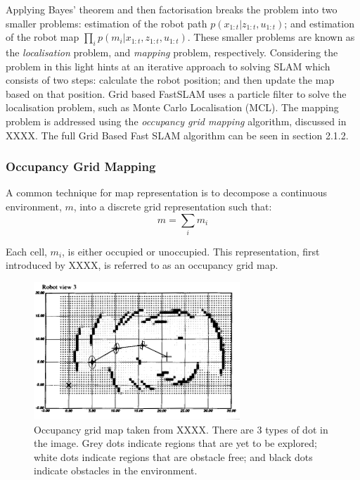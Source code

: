 \documentclass[a4paper]{article}
\begin{document}
Applying Bayes' theorem and then factorisation breaks the problem into two smaller problems: estimation of the robot path $p(x_{1:t} | z_{1:t}, u_{1:t})$; and estimation of the robot map $\prod_{i}p(m_i | x_{1:t}, z_{1:t}, u_{1:t})$. These smaller problems are known as the \textit{localisation} problem, and \textit{mapping} problem, respectively. Considering the problem in this light hints at an iterative approach to solving SLAM which consists of two steps: calculate the robot position; and then update the map based on that position. Grid based FastSLAM uses a particle filter to solve the localisation problem, such as Monte Carlo Localisation (MCL). The mapping problem is addressed using the \textit{occupancy grid mapping} algorithm, discussed in XXXX. The full Grid Based Fast SLAM algorithm can be seen in section 2.1.2.


\subsubsection{Occupancy Grid Mapping}
A common technique for map representation is to decompose a continuous environment, $m$, into a discrete grid representation such that:
\begin{equation}
m = \sum_{i} m_i
\end{equation}

Each cell, $m_i$, is either occupied or unoccupied. This representation, first introduced by XXXX, is referred to as an occupancy grid map.
\begin{figure}[h]
\centering
\includegraphics[scale=0.8]{occupancy_grid}
\caption{Occupancy grid map taken from XXXX. There are 3 types of dot in the image. Grey dots indicate regions that are yet to be explored; white dots indicate regions that are obstacle free; and black dots indicate obstacles in the environment.}
\end{figure}
\end{document}
